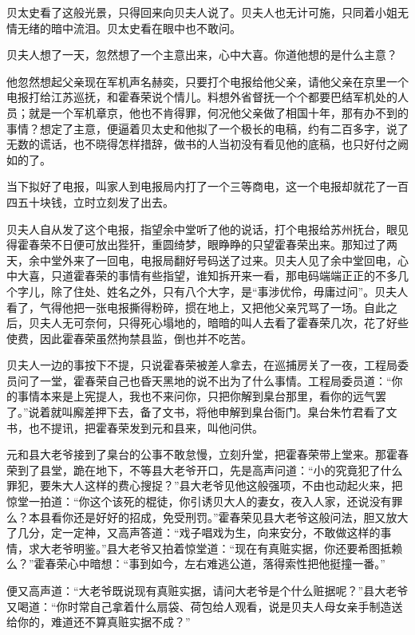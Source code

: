 \documentclass[12pt,UTF8]{ctexbook}
\begin{document}
{{{贝太史看了这般光景，只得回来向贝夫人说了。贝夫人也无计可施，只同着小姐无情无绪的暗中流泪。贝太史看在眼中也不敢问。

贝夫人想了一天，忽然想了一个主意出来，心中大喜。你道他想的是什么主意？

他忽然想起父亲现在军机声名赫奕，只要打个电报给他父亲，请他父亲在京里一个电报打给江苏巡抚，和霍春荣说个情儿。料想外省督抚一个个都要巴结军机处的人员；就是一个军机章京，他也不肯得罪，何况他父亲做了相国十年，那有办不到的事情？想定了主意，便逼着贝太史和他拟了一个极长的电稿，约有二百多字，说了无数的谎话，也不晓得怎样措辞，做书的人当初没有看见他的底稿，也只好付之阙如的了。

当下拟好了电报，叫家人到电报局内打了一个三等商电，这一个电报却就花了一百四五十块钱，立时立刻发了出去。

贝夫人自从发了这个电报，指望余中堂听了他的说话，打个电报给苏州抚台，眼见得霍春荣不日便可放出狴犴，重圆绮梦，眼睁睁的只望霍春荣出来。那知过了两天，余中堂外来了一回电，电报局翻好号码送了过来。贝夫人见了余中堂回电，心中大喜，只道霍春荣的事情有些指望，谁知拆开来一看，那电码端端正正的不多几个字儿，除了住处、姓名之外，只有八个大字，是“事涉优伶，毋庸过问”。贝夫人看了，气得他把一张电报撕得粉碎，掼在地上，又把他父亲咒骂了一场。自此之后，贝夫人无可奈何，只得死心塌地的，暗暗的叫人去看了霍春荣几次，花了好些使费，因此霍春荣虽然拘禁县监，倒也并不吃苦。

贝夫人一边的事按下不提，只说霍春荣被差人拿去，在巡捕房关了一夜，工程局委员问了一堂，霍春荣自己也昏天黑地的说不出为了什么事情。工程局委员道：“你的事情本来是上宪提人，我也不来问你，只把你解到臬台那里，看你的远气罢了。”说着就叫廨差押下去，备了文书，将他申解到臬台衙门。臬台朱竹君看了文书，也不提讯，把霍春荣发到元和县来，叫他问供。

元和县大老爷接到了臬台的公事不敢怠慢，立刻升堂，把霍春荣带上堂来。那霍春荣到了县堂，跪在地下，不等县大老爷开口，先是高声问道：“小的究竟犯了什么罪犯，要朱大人这样的费心搜捉？”县大老爷见他这般强项，不由也动起火来，把惊堂一拍道：“你这个该死的棍徒，你引诱贝大人的妻女，夜入人家，还说没有罪么？本县看你还是好好的招成，免受刑罚。”霍春荣见县大老爷这般问法，胆又放大了几分，定一定神，又高声答道：“戏子唱戏为生，向来安分，不敢做这样的事情，求大老爷明鉴。”县大老爷又拍着惊堂道：“现在有真赃实据，你还要希图抵赖么？”霍春荣心中暗想：“事到如今，左右难逃公道，落得索性把他挺撞一番。”

便又高声道：“大老爷既说现有真赃实据，请问大老爷是个什么赃据呢？”县大老爷又喝道：“你时常自己拿着什么扇袋、荷包给人观看，说是贝夫人母女亲手制造送给你的，难道还不算真赃实据不成？”

}}}
\end{document}
